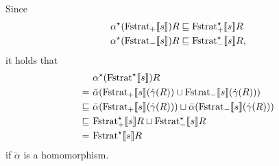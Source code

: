 \documentclass{article}
\newcommand{\Fstratm}[1]{\ensuremath \text{Fstrat}_{-}\llbracket #1 \rrbracket}
\newcommand{\Fstratp}[1]{\ensuremath \text{Fstrat}_{+}\llbracket #1 \rrbracket}
\newcommand{\Fstrata}[1]{\ensuremath \text{Fstrat}^\star\llbracket #1 \rrbracket}
\newcommand{\Fstratam}[1]{\ensuremath \text{Fstrat}^\star_{-}\llbracket #1 \rrbracket}
\newcommand{\Fstratap}[1]{\ensuremath \text{Fstrat}^\star_{+}\llbracket #1 \rrbracket}
\begin{document}
Since
\begin{align*}
  \alpha^\star(\Fstratp{s})R &\sqsubseteq \Fstratap{s}R \\
  \alpha^\star(\Fstratm{s})R &\sqsubseteq \Fstratam{s}R,
\end{align*}
it holds that
\begin{align*}
   &\ \alpha^\star(\Fstrata{s})R \\
  =&\ \ddot{\alpha}(\Fstratp{s}(\dot{\gamma}(R)) \cup \Fstratm{s}(\dot{\gamma}(R))) \\
  \sqsubseteq&\ \ddot{\alpha}(\Fstratp{s}(\dot{\gamma}(R))) \sqcup \ddot{\alpha}(\Fstratm{s}(\dot{\gamma}(R))) \\
  \sqsubseteq&\ \Fstratap{s}R \sqcup \Fstratam{s}R \\
  =&\ \Fstrata{s}R
\end{align*}
if $\ddot{\alpha}$ is a homomorphism.

\end{document}
